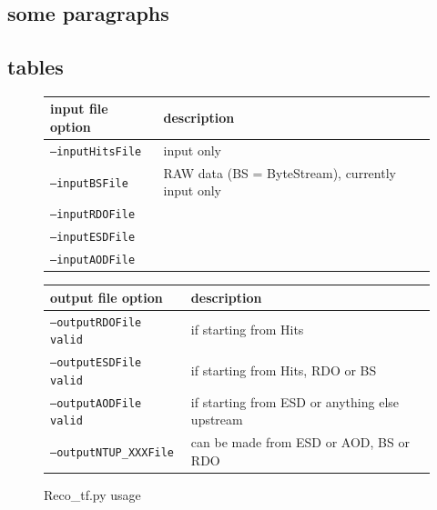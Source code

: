 \newpage

\subsection{some paragraphs}

\lipsum[1-4]

\newpage

\subsection{tables}

\begin{figure}[h]
\begin{center}
\scriptsize
\begin{tabular}{p{3 cm}p{7 cm}}
\hline\hline
input file option&description\\
\hline
\texttt{--inputHitsFile}&input only\\
\texttt{--inputBSFile}&RAW data (BS = ByteStream), currently input only\\
\texttt{--inputRDOFile}&\\
\texttt{--inputESDFile}&\\
\texttt{--inputAODFile}&\\
\hline\hline
\end{tabular}
\end{center}
\mbox{}\newline
\begin{center}
\scriptsize
\begin{tabular}{p{3 cm}p{7 cm}}
\hline\hline
output file option&description\\
\hline
\texttt{--outputRDOFile	valid}&if starting from Hits\\
\texttt{--outputESDFile	valid}&if starting from Hits, RDO or BS\\
\texttt{--outputAODFile	valid}&if starting from ESD or anything else upstream\\
\texttt{--outputNTUP\_XXXFile}&can be made from ESD or AOD, BS or RDO\\
\hline\hline
\end{tabular}
\end{center}
\caption{Reco\_tf.py usage}
\end{figure}
